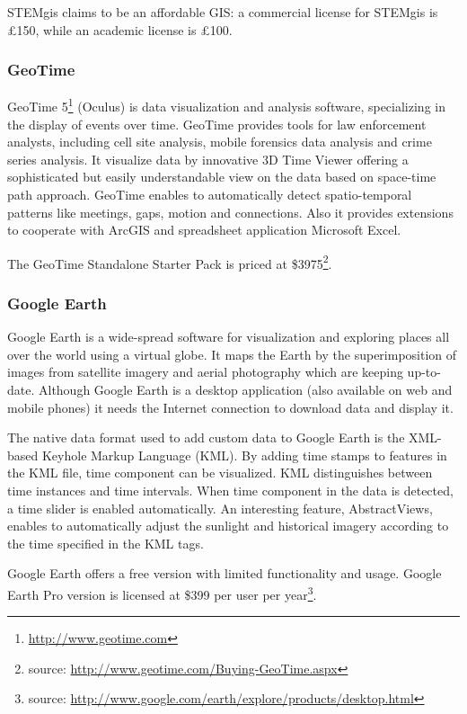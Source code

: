 \documentclass[a4paper,12pt,oneside]{book}
\begin{document}
STEMgis claims to be an affordable GIS: a commercial license for STEMgis is \pounds150,
while an academic license is \pounds100.

\subsubsection{GeoTime}
GeoTime 5\footnote{\url{http://www.geotime.com}} (Oculus)
is data visualization and analysis software, specializing in
the display of events over time. GeoTime provides tools
for law enforcement analysts, including cell site analysis, mobile forensics data analysis
and crime series analysis. It visualize data by innovative 3D Time Viewer offering a sophisticated but 
easily understandable view on the data based on space-time path approach.
GeoTime enables to automatically detect spatio-temporal patterns like meetings, gaps, motion and connections.
Also it provides extensions to cooperate with ArcGIS and spreadsheet application Microsoft Excel.

The GeoTime Standalone Starter Pack is priced at \$3975\footnote{source:
\url{http://www.geotime.com/Buying-GeoTime.aspx}}.



\subsubsection{Google Earth}
Google Earth is a wide-spread software for visualization and exploring places all over the world
using a virtual globe.  It maps the Earth by the superimposition of images
 from satellite imagery and aerial photography which are keeping up-to-date.
Although Google Earth is a desktop application (also available on web and mobile phones) it needs
the Internet connection to download data and display it.

The native data format used to add custom data to Google Earth is the XML-based Keyhole Markup Language (KML).
By adding time stamps to features in the KML file, time component can be visualized. KML distinguishes
between time instances and time intervals. When time component in the data is detected,
a time slider is enabled automatically. An interesting feature, AbstractViews, enables to automatically
adjust the sunlight and historical imagery according to the time specified in the KML tags.

Google Earth offers a free version with limited functionality and usage.
Google Earth Pro version is licensed at \$399 per user per
year\footnote{source: \url{http://www.google.com/earth/explore/products/desktop.html}}.
\end{document}
